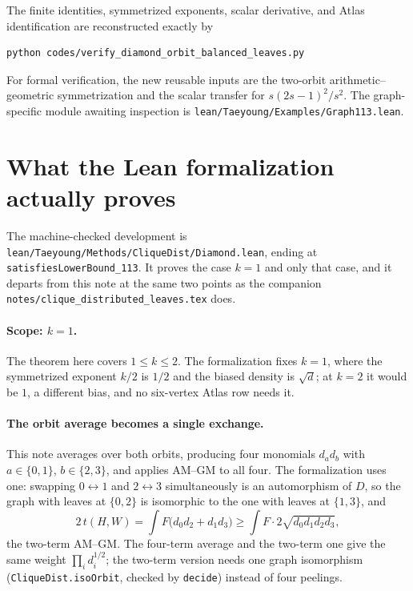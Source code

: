 \documentclass[11pt]{article}
\begin{document}
The finite identities, symmetrized exponents, scalar derivative, and Atlas
identification are reconstructed exactly by
\begin{verbatim}
python codes/verify_diamond_orbit_balanced_leaves.py
\end{verbatim}
For formal verification, the new reusable inputs are the two-orbit
arithmetic--geometric symmetrization and the scalar transfer for
$s(2s-1)^2/s^2$.  The graph-specific module awaiting inspection is
\texttt{lean/Taeyoung/Examples/Graph113.lean}.


\section{What the Lean formalization actually proves}

The machine-checked development is
\texttt{lean/Taeyoung/Methods/CliqueDist/Diamond.lean}, ending at
\texttt{satisfiesLowerBound\_113}.  It proves the case $k=1$ and only that
case, and it departs from this note at the same two points as the companion
\texttt{notes/clique\_distributed\_leaves.tex} does.

\paragraph{Scope: $k=1$.}
The theorem here covers $1\leq k\leq2$.  The formalization fixes $k=1$, where
the symmetrized exponent $k/2$ is $1/2$ and the biased density is $\sqrt d$; at
$k=2$ it would be $1$, a different bias, and no six-vertex Atlas row needs it.

\paragraph{The orbit average becomes a single exchange.}
This note averages over both orbits, producing four monomials
$d_{a}d_{b}$ with $a\in\{0,1\}$, $b\in\{2,3\}$, and applies AM--GM to all four.
The formalization uses one: swapping $0\leftrightarrow1$ and
$2\leftrightarrow3$ simultaneously is an automorphism of $D$, so the graph with
leaves at $\{0,2\}$ is isomorphic to the one with leaves at $\{1,3\}$, and
\[
 2\,t(H,W)=\int F\bigl(d_0d_2+d_1d_3\bigr)
 \geq\int F\cdot2\sqrt{d_0d_1d_2d_3},
\]
the two-term AM--GM.  The four-term average and the two-term one give the same
weight $\prod_i d_i^{1/2}$; the two-term version needs one graph isomorphism
(\texttt{CliqueDist.isoOrbit}, checked by \texttt{decide}) instead of four
peelings.
\end{document}
